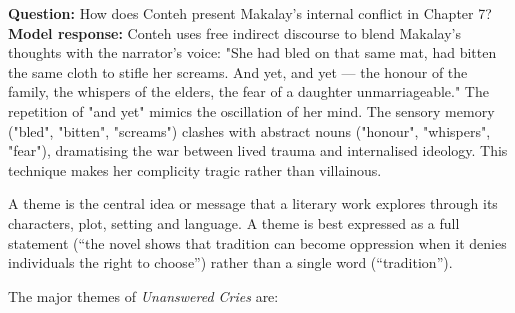 \documentclass[11pt]{article}
\newcommand{\cle}[1]{{\popxbold\color{popdark}#1}}
\newcounter{popsec}
\newcounter{popsub}
\newcommand{\courssub}[1]{%
  \stepcounter{popsub}%
  \par\vspace{9pt}\noindent{\popxbold\fontsize{11.5}{13}\selectfont\color{popink}{\color{poporange}\thepopsec.\thepopsub}\hspace{6pt}#1}\par\nopagebreak\vspace{4pt}
}
\begin{document}
\begin{exemplebox}
\textbf{Question:} How does Conteh present Makalay's internal conflict in Chapter 7?
\textbf{Model response:} Conteh uses \cle{free indirect discourse} to blend Makalay's thoughts with the narrator's voice: "She had bled on that same mat, had bitten the same cloth to stifle her screams. And yet, and yet --- the honour of the family, the whispers of the elders, the fear of a daughter unmarriageable." The repetition of "and yet" mimics the oscillation of her mind. The sensory memory ("bled", "bitten", "screams") clashes with abstract nouns ("honour", "whispers", "fear"), dramatising the war between lived trauma and internalised ideology. This technique makes her complicity tragic rather than villainous.
\end{exemplebox}

\courssub{Themes of the Novel}

\begin{definition}[Theme]
A \cle{theme} is the central idea or message that a literary work explores through its characters, plot, setting and language. A theme is best expressed as a full statement (``the novel shows that tradition can become oppression when it denies individuals the right to choose'') rather than a single word (``tradition'').
\end{definition}

The major themes of \emph{Unanswered Cries} are:
\end{document}
